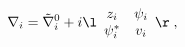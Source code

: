 \begin{equation}
\nabla_i=\tilde{\nabla}_i^0+i
\l
   \begin{array}{cc}
    z_i      & \psi_i \\
    \psi_i^* & v_i
   \end{array}
\r
\;,
\label{endom}
\end{equation}

